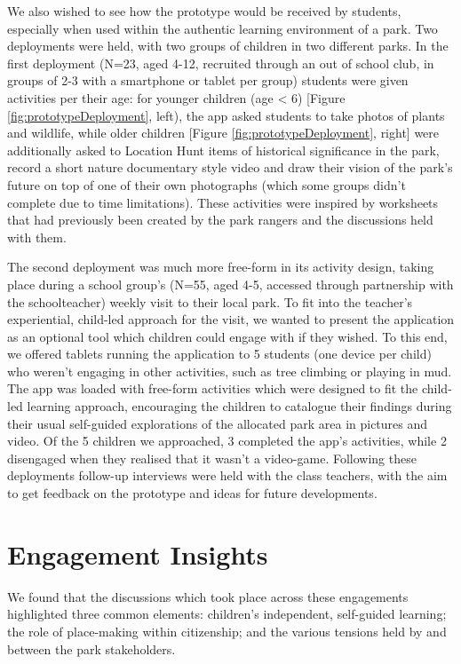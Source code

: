 We also wished to see how the prototype would be received by students, especially when used within the authentic learning environment of a park. Two deployments were held, with two groups of children in two different parks. In the first deployment (N=23, aged 4-12, recruited through an out of school club, in groups of 2-3 with a smartphone or tablet per group) students were given activities per their age: for younger children (age < 6) [Figure \ref{fig:prototypeDeployment}, left), the app asked students to take photos of plants and wildlife, while older children [Figure \ref{fig:prototypeDeployment}, right] were additionally asked to Location Hunt items of historical significance in the park, record a short nature documentary style video and draw their vision of the park’s future on top of one of their own photographs (which some groups didn’t complete due to time limitations). These activities were inspired by worksheets that had previously been created by the park rangers and the discussions held with them. 

The second deployment was much more free-form in its activity design, taking place during a school group’s (N=55, aged 4-5, accessed through partnership with the schoolteacher) weekly visit to their local park. To fit into the teacher’s experiential, child-led approach for the visit, we wanted to present the application as an optional tool which children could engage with if they wished. To this end, we offered tablets running the application to 5 students (one device per child) who weren't engaging in other activities, such as tree climbing or playing in mud. The app was loaded with free-form activities which were designed to fit the child-led learning approach, encouraging the children to catalogue their findings during their usual self-guided explorations of the allocated park area in pictures and video. Of the 5 children we approached, 3 completed the app’s activities, while 2 disengaged when they realised that it wasn't a video-game.
Following these deployments follow-up interviews were held with the class teachers, with the aim to get feedback on the prototype and ideas for future developments.

\section{Engagement Insights}
\label{sec:InfrastructureInsights}
We found that the discussions which took place across these engagements highlighted three common elements: children's independent, self-guided learning; the role of place-making within citizenship; and the various tensions held by and between the park stakeholders.

